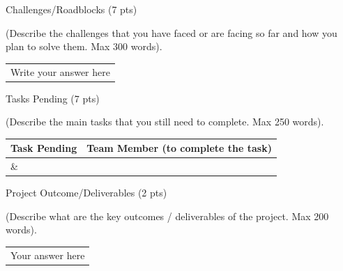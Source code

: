 \documentclass[12pt,a4paper]{article}
\newcommand{\sectiontitle}[1]{%
    {\color{GEUBlue}
    \fontsize{18}{22}\selectfont #1}
}
\newcommand{\instruction}[1]{%
    {\color{InstructionGrey}
    \fontsize{10.5}{13}\selectfont #1}
}
\newcommand{\answerbox}[2]{%
    \begin{tabularx}{\textwidth}{
        |>{\raggedright\arraybackslash}X|}
        \hline
        \parbox[t][#1][t]{\dimexpr\linewidth-12pt\relax}{
            \vspace{5pt}
            \fontsize{11}{13}\selectfont #2
        }\\
        \hline
    \end{tabularx}
}
\begin{document}
\sectiontitle{Challenges/Roadblocks (7 pts)}

\vspace{0.05cm}

\instruction{
(Describe the challenges that you have faced or are facing so far
and how you plan to solve them. Max 300 words).
}

\vspace{0.18cm}

\answerbox{4.05cm}{Write your answer here}

\vspace{0.65cm}

\sectiontitle{Tasks Pending (7 pts)}

\vspace{0.05cm}

\instruction{
(Describe the main tasks that you still need to complete.
Max 250 words).
}

\vspace{0.18cm}

\begin{tabularx}{\textwidth}{
|>{\raggedright\arraybackslash}X
|>{\raggedright\arraybackslash}X|
}
\hline

\textbf{Task Pending} &
\textbf{Team Member (to complete the task)}
\\
\hline

\parbox[t][1.25cm][t]{\linewidth}{}
&
\parbox[t][1.25cm][t]{\linewidth}{}
\\
\hline

\end{tabularx}

\newpage


\vspace*{0.30cm}

\sectiontitle{Project Outcome/Deliverables (2 pts)}

\vspace{0.05cm}

\instruction{
(Describe what are the key outcomes / deliverables of the project.
Max 200 words).
}

\vspace{0.35cm}

\answerbox{3.35cm}{Your answer here}

\vspace{0.75cm}
\end{document}
